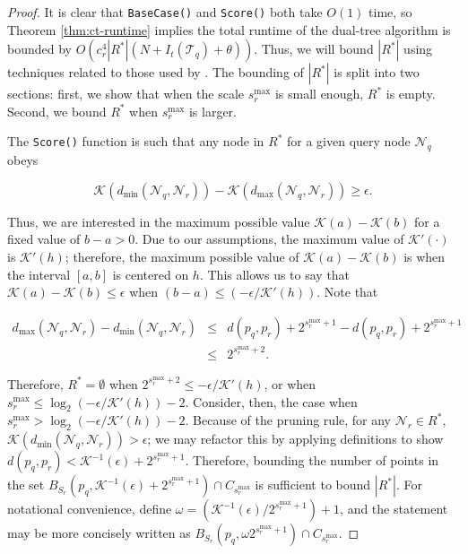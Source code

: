 \begin{proof}
It is clear that \texttt{BaseCase()} and \texttt{Score()} both take $O(1)$ time,
so Theorem \ref{thm:ct-runtime} implies the total runtime of the dual-tree
algorithm is bounded by $O(c_r^4 |R^*| (N + I_t(\mathscr{T}_q) + \theta))$.
Thus, we will bound $|R^*|$ using techniques related to those used by
\citet{ram2009}.  The bounding of $|R^*|$ is split into two sections: first,
we show that when the scale $s_r^{\max}$ is small enough, $R^*$ is empty.
Second, we bound $R^*$ when $s_r^{\max}$ is larger.

The \texttt{Score()} function is such that any node in $R^*$ for a given query
node $\mathscr{N}_q$ obeys

\begin{equation}
\mathcal{K}(d_{\min}(\mathscr{N}_q, \mathscr{N}_r)) -
\mathcal{K}(d_{\max}(\mathscr{N}_q, \mathscr{N}_r))
\ge \epsilon.
\end{equation}

Thus, we are interested in the maximum possible value $\mathcal{K}(a) -
\mathcal{K}(b)$ for a fixed value of $b - a > 0$.  Due to our assumptions, the
maximum value of $\mathcal{K}'(\cdot)$ is
$\mathcal{K}'(h)$; therefore, the maximum possible value of $\mathcal{K}(a) -
\mathcal{K}(b)$ is when the interval $[a, b]$ is centered on $h$.  This allows
us to say that $\mathcal{K}(a) - \mathcal{K}(b) \le \epsilon$ when $(b - a) \le
(-\epsilon / \mathcal{K}'(h))$.  Note that

\begin{eqnarray}
d_{\max}(\mathscr{N}_q, \mathscr{N}_r) - d_{\min}(\mathscr{N}_q, \mathscr{N}_r)
&\le& d(p_q, p_r) + 2^{s_r^{\max} + 1} - d(p_q, p_r) + 2^{s_r^{\max} + 1} \\
 &\le& 2^{s_r^{\max} + 2}.
\end{eqnarray}

Therefore, $R^* = \emptyset$ when
$2^{s_r^{\max} + 2} \le -\epsilon / \mathcal{K}'(h)$, or when
$s_r^{\max} \le \log_2( -\epsilon / \mathcal{K}'(h) ) - 2$.
%
Consider, then, the case when $s_r^{\max} > \log_2( -\epsilon /
\mathcal{K}'(h) ) - 2$.  Because of the pruning rule, for any $\mathscr{N}_r \in
R^*$, $\mathcal{K}(d_{\min}(\mathscr{N}_q, \mathscr{N}_r)) > \epsilon$;
we may refactor this by applying definitions to show
$d(p_q, p_r) < \mathcal{K}^{-1}(\epsilon) + 2^{s_r^{\max} + 1}$.
Therefore, bounding the number of points in the set
$B_{S_r}(p_q, \mathcal{K}^{-1}(\epsilon) + 2^{s_r^{\max} + 1}) \cap
C_{s_r^{\max}}$
is sufficient to bound $|R^*|$.  For notational convenience, define $\omega =
(\mathcal{K}^{-1}(\epsilon) / 2^{s_r^{\max} + 1}) + 1$, and the statement may be
more concisely written as $B_{S_r}(p_q, \omega 2^{s_r^{\max} + 1}) \cap
C_{s_r^{\max}}$.


\end{proof}
